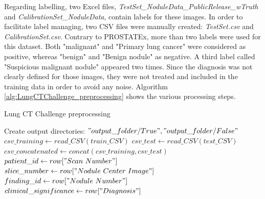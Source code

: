 Regarding labelling, two Excel files, \textit{TestSet\_NoduleData\_PublicRelease\_wTruth} and \textit{CalibrationSet\_NoduleData}, contain labels for these images. In order to facilitate label managing, two CSV files were manually created: \textit{TestSet.csv} and \textit{CalibrationSet.csv}.
Contrary to PROSTATEx, more than two labels were used for this dataset. Both "malignant" and "Primary lung cancer" were considered as positive, whereas "benign" and "Benign nodule" as negative. A third label called "Suspicious malignant nodule" appeared two times. Since the diagnosis was not clearly defined for those images, they were not treated and included in the training data in order to avoid any noise. Algorithm \ref{alg:LungCTChallenge_preprocessing} shows the various processing steps.

\begin{algorithm}
    \caption{Lung CT Challenge preprocessing}
    \label{alg:LungCTChallenge_preprocessing}
    \begin{algorithmic}[1] %
        		\State Create output directories: $"output\_folder/True", "output\_folder/False"$\\
        		\State $csv\_training \gets read\_CSV(train\_CSV)$ 
        		\State $csv\_test \gets read\_CSV(test\_CSV)$ 
            \State $csv\_concatenated \gets concat(csv\_training, csv\_test)$\\
            		\State $patient\_id \gets row["Scan\ Number"]$
            		\State $slice\_number \gets row["Nodule\ Center\ Image"]$ 
            		\State $finding\_id \gets row["Nodule\ Number"]$
            		\State $clinical\_significance \gets row["Diagnosis"]$\\
            		\EndIf\\
                					 
                				\EndIf
                			\EndFor
            			\EndFor
            		\EndFor
            \EndFor
        \EndProcedure
    \end{algorithmic}
\end{algorithm}


